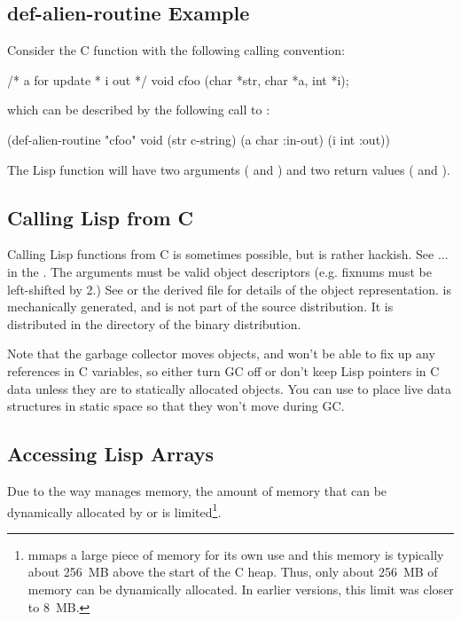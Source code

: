 \subsection{def-alien-routine Example}

Consider the C function  with the following calling convention:

\begin{example}
/* a for update
 * i out
 */
void cfoo (char *str, char *a, int *i);
\end{example}

which can be described by the following call to :

\begin{lisp}
(def-alien-routine "cfoo" void
  (str c-string)
  (a char :in-out)
  (i int :out))
\end{lisp}

The Lisp function  will have two arguments ( and )
and two return values ( and ).


\subsection{Calling Lisp from C}

Calling Lisp functions from C is sometimes possible, but is rather hackish.
See  ...  in the .  The
arguments must be valid \cmucl{} object descriptors (e.g.  fixnums must be
left-shifted by 2.)  See  or the derived
file  for details of the object representation.
 is mechanically generated, and is not part of the
source distribution.  It is distributed in the  directory of the
binary distribution.

Note that the garbage collector moves objects, and won't be able to fix up any
references in C variables, so either turn GC off or don't keep Lisp pointers
in C data unless they are to statically allocated objects.  You can use
 to place live data structures in static space so that they
won't move during GC.

\subsection{Accessing Lisp Arrays}

Due to the way \cmucl{} manages memory, the amount of memory that can
be dynamically allocated by  or  is
limited\footnote{\cmucl{} mmaps a large piece of memory for its own
use and this memory is typically about 256~MB above the start of the C
heap. Thus, only about 256~MB of memory can be dynamically allocated.
In earlier versions, this limit was closer to 8~MB.}.

